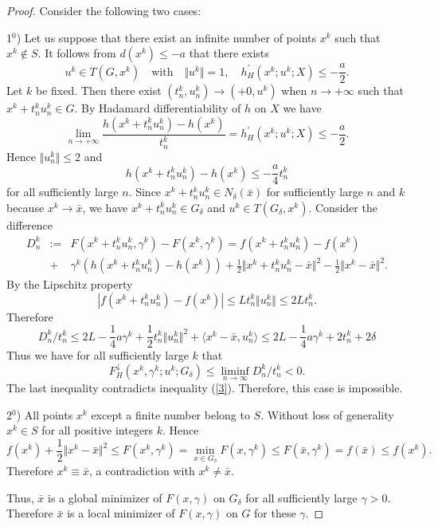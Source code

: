 \documentclass[10pt,a4paper]{amsart}
\def\ld#1{#1^{\downarrow}_{H}}
\newcommand{\norm}[1]{\Vert#1\Vert}
\newcommand{\scalpr}[2]{\langle#1,#2\rangle}
\begin{document}
\begin{proof}
Consider the following two cases:

1$^0$) 
Let us suppose that there exist an infinite number of points $x^k$ such that $x^k\notin S$. 
It follows from $d(x^k)\le -a$ that there exists
\[
u^k\in T(G,x^k) \quad\textrm{with}\quad
\norm{u^k}=1,\quad  h^\prime_H(x^k;u^k;X)\le -\frac{a}{2}.
\]
Let $k$ be fixed. Then
there exist $(t^k_n,u^k_n)\to(+0,u^k)$ when $n\to +\infty$ such that
$x^k+t^k_n u^k_n\in G$. By Hadamard differentiability of $h$ on $X$ we have
\begin{equation}\label{p2}
\lim_{n\to+\infty}\frac{h(x^k+t^k_n u^k_n)-h(x^k)}{t^k_n}=
h^\prime_H(x^k;u^k;X)\le -\frac{a}{2}.
\end{equation}
Hence $\norm{u^k_n}\le 2$ and
\begin{equation}\label{p3}
h(x^k+t^k_n u^k_n)-h(x^k)\le -\frac{a}{4}t^k_n
\end{equation}
for all sufficiently large $n$. Since $x^k+t^k_n u^k_n\in N_\delta(\bar x)$
for sufficiently large $n$ and $k$ because $x^k\to\bar x$, we have $x^k+t^k_n u^k_n\in G_\delta$
and $u^k\in T(G_\delta,x^k)$. Consider the difference
\[
\begin{array}{rrl}
D^k_n & := & F(x^k+t^k_n u^k_n,\gamma^k)-F(x^k,\gamma^k)=f(x^k+t^k_n u^k_n)-f(x^k)\\
&+ & \gamma^k(h(x^k+t^k_n u^k_n)-h(x^k))+\frac{1}{2}\norm{x^k+t^k_n u^k_n-\bar x}^2-
\frac{1}{2}\norm{x^k-\bar x}^2.
\end{array}
\]
By the Lipschitz property
\[
|f(x^k+t^k_n u^k_n)-f(x^k)|\le L t^k_n\norm{u^k_n}\le 2L t^k_n.
\]
Therefore
\[
D^k_n/t^k_n\le 2L-\frac{1}{4}a\gamma^k+\frac{1}{2}t^k_n\norm{u^k_n}^2+
\scalpr{x^k-\bar x}{u^k_n}\le 2L-\frac{1}{4} a\gamma^k+2t^k_n+2\delta
\]
Thus we have for all sufficiently large $k$ that
\[
\ld F(x^k,\gamma^k;u^k;G_\delta)\le\liminf_{n\to\infty}D^k_n/t^k_n<0.
\]
The last inequality  contradicts inequality (\ref{3}). Therefore, this case is impossible. 

2$^0$) All points $x^k$ except a finite number belong to $S$.
Without loss of generality $x^k\in S$ for all positive integers $k$. Hence
\[
f(x^k)+
\frac{1}{2}\norm{x^k-\bar x}^2\le F(x^k,\gamma^k)=\min_{x\in G_\delta}F(x,\gamma^k)
\le F(\bar x,\gamma^k)=f(\bar x)\le f(x^k).
\]
Therefore $x^k\equiv\bar x$, a contradiction with $x^k\ne\bar x$.
 
Thus,  $\bar x$ is a global minimizer of $F(x,\gamma)$ on
$G_\delta$ for all sufficiently large $\gamma>0$. Therefore
$\bar x$ is a local minimizer of $F(x,\gamma)$ on $G$ for these $\gamma$.
\end{proof}
\end{document}
